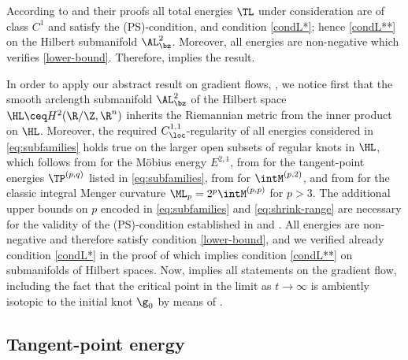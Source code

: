 \begin{refproof}
According to  and their  proofs
all total 
energies $\TL$ under consideration are of class $C^1$ and
satisfy the (PS)-condition, and condition \ref{condL*}; hence
\ref{condL**} on the Hilbert submanifold $\AL^2_\bz$. Moreover,
all energies
are non-negative which verifies \ref{lower-bound}. 
Therefore,   implies
the result.
\end{refproof}


\begin{refproof}
In order to apply our abstract result on gradient flows,  
, we notice 
first that the smooth arclength submanifold $\AL^2_\bz$ of the Hilbert
space $\HL \ceq H^2(\R/\Z,\R^n)$ inherits the Riemannian metric from the inner
product on $\HL$.
Moreover, the required  $C^{1,1}_\loc$-regularity
of all energies considered in \cref{eq:subfamilies}  holds true
 on the larger open subsets of regular knots in $\HL$,
 which  follows
from \cite[Theorem 3.1]{reiter-schumacher_2021} for the M\"obius energy
$E^{2,1}$, from \cite[Theorem 3.5]{steenebruegge_2023} for the tangent-point
energies $\TP^{(p,q)}$ listed in \cref{eq:subfamilies}, from
\cite[Theorem 2.1]{knappmann-etal_2023} for $\intM^{(p,2)}$, and
from \cite[Theorem 1.55]{knappmann_2020} for the classic integral Menger
curvature 
$\ML_p
=2^p\intM^{(p,p)} $
for $p>3$. The additional upper bounds on $p$ encoded
in  \cref{eq:subfamilies} and \cref{eq:shrink-range} are necessary for
the validity of the (PS)-condition established in 
 and . 
All energies are non-negative and therefore
satisfy condition \ref{lower-bound}, and we verified already condition
\ref{condL*} in the proof of  which 
implies condition \ref{condL**} on submanifolds of Hilbert spaces. Now,
 implies all statements on the gradient flow, including
the fact that the critical point in the limit as $t\to\infty$ is ambiently
isotopic to the initial knot $\g_0$ by means of 
. 
\end{refproof}


\subsection{Tangent-point energy}\label{sec:tanpoint}

